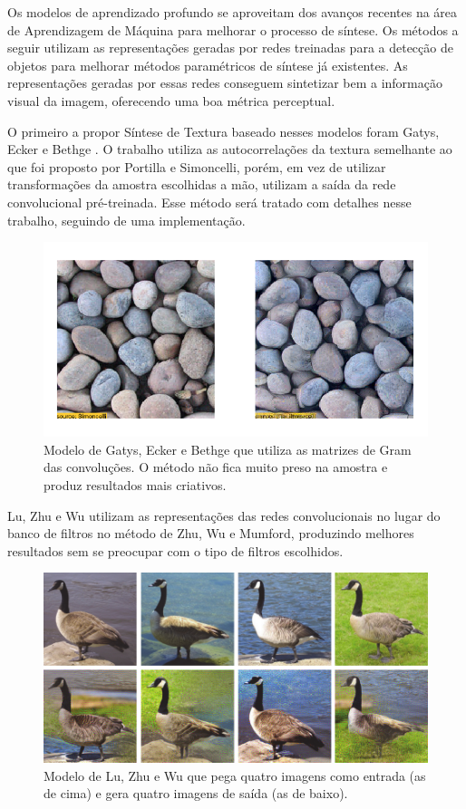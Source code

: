Os modelos de aprendizado profundo se aproveitam
dos avanços recentes na área de Aprendizagem
de Máquina para melhorar o processo de síntese.
Os métodos a seguir utilizam as representações
geradas por redes treinadas para a detecção
de objetos para melhorar métodos paramétricos
de síntese já existentes.
As representações geradas por essas
redes conseguem sintetizar bem a informação
visual da imagem, oferecendo uma boa
métrica perceptual.


O primeiro a propor Síntese
de Textura baseado nesses modelos foram
Gatys, Ecker e Bethge \cite{Gatys2015}.
O trabalho utiliza as autocorrelações
da textura semelhante ao que foi proposto
por Portilla e Simoncelli, porém, em
vez de utilizar transformações da amostra
escolhidas a mão, utilizam a saída da
rede convolucional pré-treinada. 
Esse método será tratado com detalhes
nesse trabalho, seguindo de uma implementação.

\begin{figure}[!ht]
	\centering
	\includegraphics[width=\linewidth*2/3]{files/assets/articles/gatys1.png}
	\caption{Modelo de Gatys, Ecker e Bethge que
	utiliza as matrizes de Gram das convoluções.
	O método não fica muito preso na amostra
	e produz resultados mais criativos.}
	\label{img:preview}
\end{figure}


Lu, Zhu e Wu \cite{Lu2016}
utilizam as representações
das redes convolucionais
no lugar do banco de filtros
no método de Zhu, Wu e Mumford,
produzindo melhores resultados sem
se preocupar com o tipo de filtros
escolhidos.

\begin{figure}[!ht]
	\includegraphics[width=\linewidth]{files/assets/articles/lu.png}
	\caption{Modelo de Lu, Zhu e Wu que pega quatro imagens como
	entrada (as de cima) e gera quatro imagens de saída (as de baixo).}
	\label{img:preview}
\end{figure}



